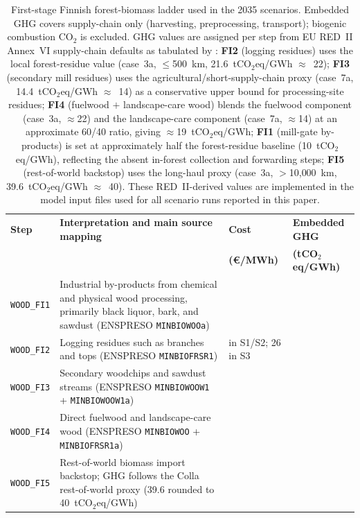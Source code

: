 \documentclass{article}
\begin{document}
\begin{table}[H]
\centering
\footnotesize
\caption{First-stage Finnish forest-biomass ladder used in the 2035 scenarios. Embedded GHG covers supply-chain only (harvesting, preprocessing, transport); biogenic combustion CO$_2$ is excluded. GHG values are assigned per step from EU RED~II Annex~VI supply-chain defaults as tabulated by \citet{collaOptimalUseLignocellulosic2022}: \textbf{FI2} (logging residues) uses the local forest-residue value (case~3a, $\leq$500~km, 21.6~tCO$_2$eq/GWh $\approx$~22); \textbf{FI3} (secondary mill residues) uses the agricultural/short-supply-chain proxy (case~7a, 14.4~tCO$_2$eq/GWh $\approx$~14) as a conservative upper bound for processing-site residues; \textbf{FI4} (fuelwood $+$ landscape-care wood) blends the fuelwood component (case~3a, $\approx$22) and the landscape-care component (case~7a, $\approx$14) at an approximate 60/40 ratio, giving $\approx$19~tCO$_2$eq/GWh; \textbf{FI1} (mill-gate by-products) is set at approximately half the forest-residue baseline (10~tCO$_2$eq/GWh), reflecting the absent in-forest collection and forwarding steps; \textbf{FI5} (rest-of-world backstop) uses the long-haul proxy (case~3a, $>$10{,}000~km, 39.6~tCO$_2$eq/GWh $\approx$~40). These RED~II-derived values are implemented in the model input files used for all scenario runs reported in this paper.}
\label{tab:fi_biomass_ladder}
\begin{tabularx}{\linewidth}{>{\raggedright\arraybackslash}p{2.2cm}X>{\centering\arraybackslash}p{2.2cm}>{\centering\arraybackslash}p{2.3cm}}
\toprule
\textbf{Step} & \textbf{Interpretation and main source mapping} & \textbf{Cost} & \textbf{Embedded GHG} \\
 &  & \textbf{(€/MWh)} & \textbf{(tCO$_2$eq/GWh)} \\
\midrule
\texttt{WOOD\_FI1} & Industrial by-products from chemical and physical wood processing, primarily black liquor, bark, and sawdust (ENSPRESO \texttt{MINBIOWOOa}) & 11 & 10 \\
\texttt{WOOD\_FI2} & Logging residues such as branches and tops (ENSPRESO \texttt{MINBIOFRSR1}) & 22 in S1/S2; 26 in S3 & 22 \\
\texttt{WOOD\_FI3} & Secondary woodchips and sawdust streams (ENSPRESO \texttt{MINBIOWOOW1} + \texttt{MINBIOWOOW1a}) & 27 & 14 \\
\texttt{WOOD\_FI4} & Direct fuelwood and landscape-care wood (ENSPRESO \texttt{MINBIOWOO} + \texttt{MINBIOFRSR1a}) & 33 & 19 \\
\texttt{WOOD\_FI5} & Rest-of-world biomass import backstop; GHG follows the Colla rest-of-world proxy (39.6 rounded to 40~tCO$_2$eq/GWh) & 70 & 40 \\
\bottomrule
\end{tabularx}
\end{table}
\end{document}
